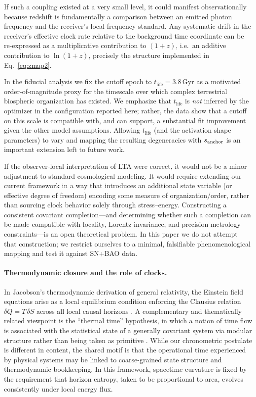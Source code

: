 \documentclass[10pt]{article}
\newcommand{\tL}{t_{\mathrm{life}}}
\begin{document}
If such a coupling existed at a very small level, it could manifest observationally because
redshift is fundamentally a comparison between an emitted photon frequency and the receiver's local
frequency standard. Any systematic drift in the receiver’s effective clock rate relative to the
background time coordinate can be re-expressed as a multiplicative contribution to $(1+z)$, i.e.\ an
additive contribution to $\ln(1+z)$, precisely the structure implemented in
Eq.~\eqref{eq:zmap2}.

In the fiducial analysis we fix the cutoff epoch to $\tL=3.8\,\mathrm{Gyr}$ as a motivated
order-of-magnitude proxy for the timescale over which complex terrestrial biospheric organization
has existed. We emphasize that $\tL$ is \emph{not} inferred by the optimizer in the configuration
reported here; rather, the data show that a cutoff on this scale is compatible with, and can support,
a substantial fit improvement given the other model assumptions. Allowing $\tL$ (and the activation
shape parameters) to vary and mapping the resulting degeneracies with $s_{\rm anchor}$ is an
important extension left to future work.

If the observer-local interpretation of LTA were correct, it would not be a minor adjustment to
standard cosmological modeling. It would require extending our current framework in a way that
introduces an additional state variable (or effective degree of freedom) encoding some measure of
organization/order, rather than sourcing clock behavior solely through stress--energy. Constructing
a consistent covariant completion---and determining whether such a completion can be made compatible
with locality, Lorentz invariance, and precision metrology constraints---is an open theoretical
problem. In this paper we do not attempt that construction; we restrict ourselves to a minimal,
falsifiable phenomenological mapping and test it against SN+BAO data.

\paragraph{Thermodynamic closure and the role of clocks.}
In Jacobson’s thermodynamic derivation of general relativity, the Einstein field equations arise as a
local equilibrium condition enforcing the Clausius relation $\delta Q = T\,\delta S$ across all
local causal horizons \cite{Jacobson1995EinsteinEOS}. A complementary and thematically related viewpoint is the ``thermal time'' hypothesis, in which a
notion of time flow is associated with the statistical state of a generally covariant system via
modular structure rather than being taken as primitive \cite{ConnesRovelli1994ThermalTime}.
While our chronometric postulate is different in content, the shared motif is that the operational
time experienced by physical systems may be linked to coarse-grained state structure and
thermodynamic bookkeeping. In this framework, spacetime curvature is fixed
by the requirement that horizon entropy, taken to be proportional to area, evolves consistently
under local energy flux.
\end{document}
